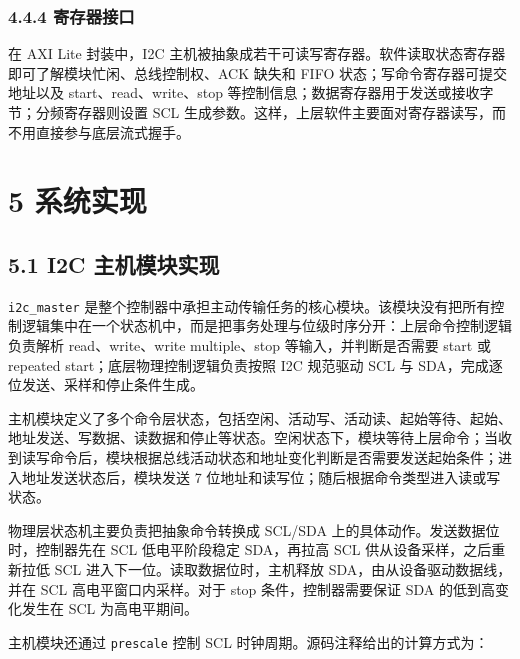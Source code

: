 \subsubsection{4.4.4 寄存器接口}\label{ux5bc4ux5b58ux5668ux63a5ux53e3}

在 AXI Lite 封装中，I2C
主机被抽象成若干可读写寄存器。软件读取状态寄存器即可了解模块忙闲、总线控制权、ACK
缺失和 FIFO 状态；写命令寄存器可提交地址以及 start、read、write、stop
等控制信息；数据寄存器用于发送或接收字节；分频寄存器则设置 SCL
生成参数。这样，上层软件主要面对寄存器读写，而不用直接参与底层流式握手。

\section{5 系统实现}\label{ux7cfbux7edfux5b9eux73b0}

\subsection{5.1 I2C
主机模块实现}\label{i2c-ux4e3bux673aux6a21ux5757ux5b9eux73b0}

\texttt{i2c\_master}
是整个控制器中承担主动传输任务的核心模块。该模块没有把所有控制逻辑集中在一个状态机中，而是把事务处理与位级时序分开：上层命令控制逻辑负责解析
read、write、write multiple、stop 等输入，并判断是否需要 start 或
repeated start；底层物理控制逻辑负责按照 I2C 规范驱动 SCL 与
SDA，完成逐位发送、采样和停止条件生成。

主机模块定义了多个命令层状态，包括空闲、活动写、活动读、起始等待、起始、地址发送、写数据、读数据和停止等状态。空闲状态下，模块等待上层命令；当收到读写命令后，模块根据总线活动状态和地址变化判断是否需要发送起始条件；进入地址发送状态后，模块发送
7 位地址和读写位；随后根据命令类型进入读或写状态。

物理层状态机主要负责把抽象命令转换成 SCL/SDA
上的具体动作。发送数据位时，控制器先在 SCL 低电平阶段稳定 SDA，再拉高
SCL 供从设备采样，之后重新拉低 SCL 进入下一位。读取数据位时，主机释放
SDA，由从设备驱动数据线，并在 SCL 高电平窗口内采样。对于 stop
条件，控制器需要保证 SDA 的低到高变化发生在 SCL 为高电平期间。

主机模块还通过 \texttt{prescale} 控制 SCL
时钟周期。源码注释给出的计算方式为：

\begin{Shaded}
\begin{Highlighting}[]
\end{Highlighting}
\end{Shaded}

